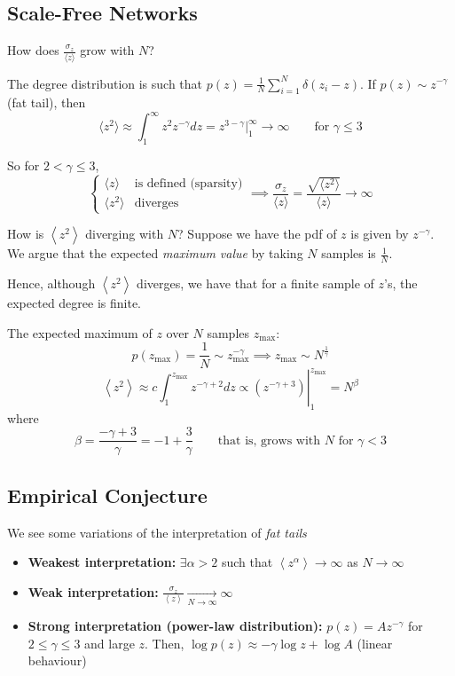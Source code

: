 \documentclass[12pt]{article}
\theoremstyle{definition}
\newcommand{\ip}[1]{\left\langle{#1}\right\rangle}
\begin{document}
\newpage
\subsection{Scale-Free Networks}

How does $\frac{\sigma_z}{\langle z\rangle}$ grow with $N$? 

The degree distribution is such that $p(z)=\frac{1}{N}\sum_{i=1}^N \delta(z_i-z)$. If $p(z) \sim z^{-\gamma}$ (fat tail), then 
\[
\langle z^2\rangle\approx \int_1^\infty z^2z^{-\gamma}dz=z^{3-\gamma}\bigr|_1^\infty\to \infty \qquad \text{for }\gamma\leq 3
\]

So for $2<\gamma\leq 3$, $$\begin{cases} \langle z\rangle & \text{is defined (sparsity)} \\ \langle z^2\rangle & \text{diverges}\end{cases} \implies \frac{\sigma_z}{\langle z\rangle} = \frac{\sqrt{\langle z^2\rangle}}{\langle z\rangle}\to\infty$$

How is $\ip{z^2}$ diverging with $N$? Suppose we have the pdf of $z$ is given by $z^{-\gamma}$. We argue that the expected \textit{maximum value} by taking $N$ samples is $\frac{1}{N}$. 

Hence, although $\ip{z^2}$ diverges, we have that for a finite sample of $z$'s, the expected degree is finite. 

The expected maximum of $z$ over $N$ samples $z_{\max}$: 
\[
p(z_{\max})=\frac{1}{N} \sim z_{\max}^{-\gamma}\implies z_{\max}\sim N^{\frac{1}{\gamma}}
\]
\[
\ip{z^2}\approx c\left.\int_1^{z_{\max}}z^{-\gamma+2}dz\propto (z^{-\gamma+3})\right|_1^{z_{\max}}=N^\beta
\]
where
\[
\beta = \frac{-\gamma+3}{\gamma} = -1+\frac{3}{\gamma} \qquad \text{that is, grows with $N$ for }\gamma<3
\]

\subsection{Empirical Conjecture}
We see some variations of the interpretation of \textit{fat tails}
\begin{itemize}
    \item \textbf{Weakest interpretation:} $\exists\alpha>2$ such that $\ip{z^\alpha}\to \infty$ as $N\to\infty$
    \item \textbf{Weak interpretation:} $\frac{\sigma_z}{\ip{z}}\xrightarrow[N\to\infty]{}\infty$
    \item \textbf{Strong interpretation (power-law distribution):} $p(z)=Az^{-\gamma}$ for $2\leq \gamma\leq 3$ and large $z$. Then, $\log p(z)\approx -\gamma\log z + \log A$ (linear behaviour)
\end{itemize}
\end{document}
